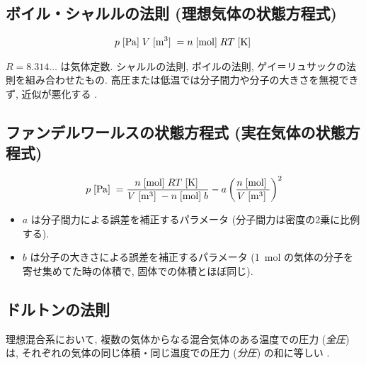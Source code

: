 \documentclass[a4paper,11pt]{jsarticle}
\newcommand{\braunit}[1]{\;\text{[}\unit[per-mode = symbol]{#1}\text{]}\;}
\begin{document}
\subsection{ボイル・シャルルの法則 (理想気体の状態方程式)}
\begin{align*}
  p\braunit{\Pa}V\braunit{\m^3} = n\braunit{\mol}RT\braunit{\K}
\end{align*}
\par $R=8.314\dots$ は気体定数. シャルルの法則, ボイルの法則, ゲイ＝リュサックの法則を組み合わせたもの. 高圧または低温では分子間力や分子の大きさを無視できず, 近似が悪化する
\cite[pp.15]{thermo}.

\subsection{ファンデルワールスの状態方程式 (実在気体の状態方程式)}
\begin{align*}
  p\braunit{\Pa} = \frac{n\braunit{\mol}RT\braunit{\K}}{V\braunit{\m^3} - n\braunit{\mol}b} - a\left(\frac{n\braunit{\mol}}{V\braunit{\m^3}}\right)^2
\end{align*}
\begin{itemize}
  \item $a$ は分子間力による誤差を補正するパラメータ (分子間力は密度の2乗に比例する).
  \item $b$ は分子の大きさによる誤差を補正するパラメータ (\qty{1}{\mol} の気体の分子を寄せ集めてた時の体積で, 固体での体積とほぼ同じ).
\end{itemize}
\par \cite[pp.17]{thermo}

\subsection{ドルトンの法則}
理想混合系において, 複数の気体からなる混合気体のある温度での圧力 (\emph{全圧}) は,
それぞれの気体の同じ体積・同じ温度での圧力 (\emph{分圧}) の和に等しい
\cite[pp.18]{thermo}.
\end{document}
